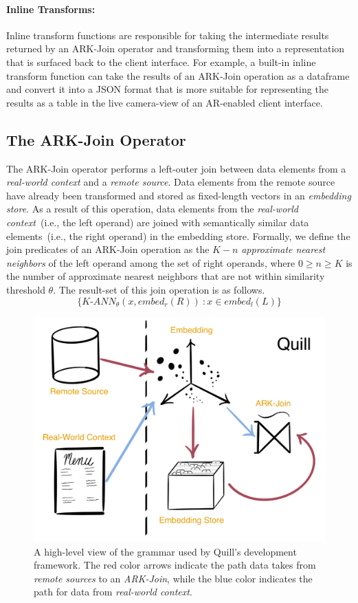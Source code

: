 \documentclass[11pt]{article}
\begin{document}
\paragraph{Inline Transforms:}
\label{sec:grammar:inline}
Inline transform functions are responsible for taking the intermediate results returned by an ARK-Join operator and transforming them into a representation that is surfaced back to the client interface.
For example, a built-in inline transform function can take the results of an ARK-Join operation as a dataframe and convert it into a JSON format that is more suitable for representing the results as a table in the live camera-view of an AR-enabled client interface.

\subsection{The ARK-Join Operator}
\label{sec:grammar:ark}
The ARK-Join operator performs a left-outer join between data elements from a \emph{real-world context} and a \textit{remote source}. Data elements from the remote source have already been transformed and stored as fixed-length vectors in an \emph{embedding store}.
As a result of this operation, data elements from the \textit{real-world context}~(i.e., the left operand) are joined with semantically similar data elements~(i.e., the right operand) in the embedding store.
Formally, we define the join predicates of an ARK-Join operation as the $K - n$ \emph{approximate nearest neighbors} of the left operand among the set of right operands, where $0 \ge n \ge K$ is the number of approximate nearest neighbors that are not within similarity threshold $\theta$.
The result-set of this join operation is as follows.
\begin{equation}
\{K\mbox{-}ANN_\theta(x, embed_r(R)) \ : x \in embed_l(L)\}
\end{equation}

\begin{figure}[t]
  \centering
  \includegraphics[width=0.6\linewidth]{figs/grammar-w-text.pdf}
  \caption{A high-level view of the grammar used by Quill's development framework. The red color arrows indicate the path data takes from \emph{remote sources} to an \emph{ARK-Join}, while the blue color indicates the path for data from \emph{real-world context}.}
  \label{fig:grammar}
\end{figure}
\end{document}
